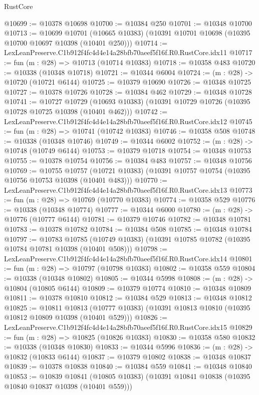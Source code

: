 \begin{lexlean}{RustCore}
\begin{coremodule}
@10699 := @10378 @10698
@10700 := @10384 @250
@10701 := @10348 @10700
@10713 := @10699
    @10701
    (@10665 @10383)
    (@10391 @10701 @10698 (@10395 @10700 @10697 @10398 (@10401 @250)))
@10714 := LexLeanPreserve.C1b912f4fc4d4e14a28bfb70aeef5f16f.R0.RustCore.idx11
@10717 := fun (m : @28) => @10713 (@10714 @10383)
@10718 := @10358 @483
@10720 := @10338 (@10348 @10718)
@10721 := @10344 @6004
@10724 := (m : @28) -> @10720 (@10721 @6144)
@10725 := @10379 @10690
@10726 := @10348 @10725
@10727 := @10378 @10726
@10728 := @10384 @462
@10729 := @10348 @10728
@10741 := @10727
    @10729
    (@10693 @10383)
    (@10391 @10729 @10726 (@10395 @10728 @10725 @10398 (@10401 @462)))
@10742 := LexLeanPreserve.C1b912f4fc4d4e14a28bfb70aeef5f16f.R0.RustCore.idx12
@10745 := fun (m : @28) => @10741 (@10742 @10383)
@10746 := @10358 @508
@10748 := @10338 (@10348 @10746)
@10749 := @10344 @6002
@10752 := (m : @28) -> @10748 (@10749 @6144)
@10753 := @10379 @10718
@10754 := @10348 @10753
@10755 := @10378 @10754
@10756 := @10384 @483
@10757 := @10348 @10756
@10769 := @10755
    @10757
    (@10721 @10383)
    (@10391 @10757 @10754 (@10395 @10756 @10753 @10398 (@10401 @483)))
@10770 := LexLeanPreserve.C1b912f4fc4d4e14a28bfb70aeef5f16f.R0.RustCore.idx13
@10773 := fun (m : @28) => @10769 (@10770 @10383)
@10774 := @10358 @529
@10776 := @10338 (@10348 @10774)
@10777 := @10344 @6000
@10780 := (m : @28) -> @10776 (@10777 @6144)
@10781 := @10379 @10746
@10782 := @10348 @10781
@10783 := @10378 @10782
@10784 := @10384 @508
@10785 := @10348 @10784
@10797 := @10783
    @10785
    (@10749 @10383)
    (@10391 @10785 @10782 (@10395 @10784 @10781 @10398 (@10401 @508)))
@10798 := LexLeanPreserve.C1b912f4fc4d4e14a28bfb70aeef5f16f.R0.RustCore.idx14
@10801 := fun (m : @28) => @10797 (@10798 @10383)
@10802 := @10358 @559
@10804 := @10338 (@10348 @10802)
@10805 := @10344 @5998
@10808 := (m : @28) -> @10804 (@10805 @6144)
@10809 := @10379 @10774
@10810 := @10348 @10809
@10811 := @10378 @10810
@10812 := @10384 @529
@10813 := @10348 @10812
@10825 := @10811
    @10813
    (@10777 @10383)
    (@10391 @10813 @10810 (@10395 @10812 @10809 @10398 (@10401 @529)))
@10826 := LexLeanPreserve.C1b912f4fc4d4e14a28bfb70aeef5f16f.R0.RustCore.idx15
@10829 := fun (m : @28) => @10825 (@10826 @10383)
@10830 := @10358 @580
@10832 := @10338 (@10348 @10830)
@10833 := @10344 @5996
@10836 := (m : @28) -> @10832 (@10833 @6144)
@10837 := @10379 @10802
@10838 := @10348 @10837
@10839 := @10378 @10838
@10840 := @10384 @559
@10841 := @10348 @10840
@10853 := @10839
    @10841
    (@10805 @10383)
    (@10391 @10841 @10838 (@10395 @10840 @10837 @10398 (@10401 @559)))

\end{coremodule}
\end{lexlean}
